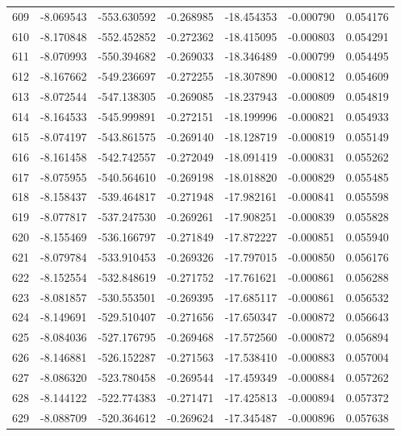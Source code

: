 \begin{tabular}{rrrrrrr}
 609 &  -8.069543 & -553.630592 & -0.268985 & -18.454353 &  -0.000790 &  0.054176 \\
 610 &  -8.170848 & -552.452852 & -0.272362 & -18.415095 &  -0.000803 &  0.054291 \\
 611 &  -8.070993 & -550.394682 & -0.269033 & -18.346489 &  -0.000799 &  0.054495 \\
 612 &  -8.167662 & -549.236697 & -0.272255 & -18.307890 &  -0.000812 &  0.054609 \\
 613 &  -8.072544 & -547.138305 & -0.269085 & -18.237943 &  -0.000809 &  0.054819 \\
 614 &  -8.164533 & -545.999891 & -0.272151 & -18.199996 &  -0.000821 &  0.054933 \\
 615 &  -8.074197 & -543.861575 & -0.269140 & -18.128719 &  -0.000819 &  0.055149 \\
 616 &  -8.161458 & -542.742557 & -0.272049 & -18.091419 &  -0.000831 &  0.055262 \\
 617 &  -8.075955 & -540.564610 & -0.269198 & -18.018820 &  -0.000829 &  0.055485 \\
 618 &  -8.158437 & -539.464817 & -0.271948 & -17.982161 &  -0.000841 &  0.055598 \\
 619 &  -8.077817 & -537.247530 & -0.269261 & -17.908251 &  -0.000839 &  0.055828 \\
 620 &  -8.155469 & -536.166797 & -0.271849 & -17.872227 &  -0.000851 &  0.055940 \\
 621 &  -8.079784 & -533.910453 & -0.269326 & -17.797015 &  -0.000850 &  0.056176 \\
 622 &  -8.152554 & -532.848619 & -0.271752 & -17.761621 &  -0.000861 &  0.056288 \\
 623 &  -8.081857 & -530.553501 & -0.269395 & -17.685117 &  -0.000861 &  0.056532 \\
 624 &  -8.149691 & -529.510407 & -0.271656 & -17.650347 &  -0.000872 &  0.056643 \\
 625 &  -8.084036 & -527.176795 & -0.269468 & -17.572560 &  -0.000872 &  0.056894 \\
 626 &  -8.146881 & -526.152287 & -0.271563 & -17.538410 &  -0.000883 &  0.057004 \\
 627 &  -8.086320 & -523.780458 & -0.269544 & -17.459349 &  -0.000884 &  0.057262 \\
 628 &  -8.144122 & -522.774383 & -0.271471 & -17.425813 &  -0.000894 &  0.057372 \\
 629 &  -8.088709 & -520.364612 & -0.269624 & -17.345487 &  -0.000896 &  0.057638 \\

\end{tabular}

